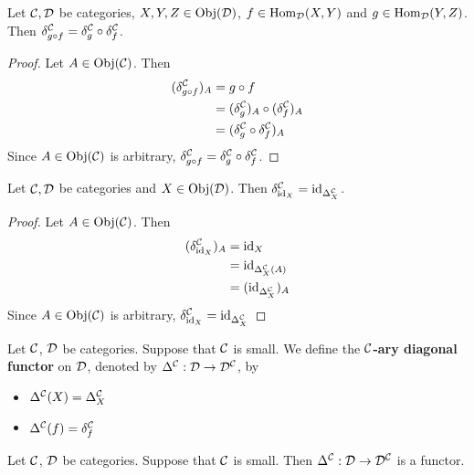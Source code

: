 \documentclass{book}
\begin{document}
	\begin{ex} 
		Let $\mathcal{C}, \mathcal{D}$ be categories, $X, Y, Z \in \operatorname{Obj}(\mathcal{D})$, $f \in \operatorname{Hom}_{\mathcal{D}}(X,Y)$ and $g \in \operatorname{Hom}_{\mathcal{D}}(Y,Z)$. Then $\delta^{\mathcal{C}}_{g \circ f} = \delta^{\mathcal{C}}_g \circ \delta^{\mathcal{C}}_f$.
	\end{ex}

	\begin{proof}
		Let $A \in \operatorname{Obj}(\mathcal{C})$. Then 
		\begin{align*}
			(\delta^{\mathcal{C}}_{g \circ f})_A
			& = g \circ f \\
			& = (\delta^{\mathcal{C}}_g)_A \circ (\delta^{\mathcal{C}}_f)_A \\
			& = (\delta^{\mathcal{C}}_g \circ \delta^{\mathcal{C}}_f)_A
		\end{align*}
		Since $A \in \operatorname{Obj}(\mathcal{C})$ is arbitrary, $\delta^{\mathcal{C}}_{g \circ f} = \delta^{\mathcal{C}}_g \circ \delta^{\mathcal{C}}_f$.
	\end{proof}

	\begin{ex} 
		Let $\mathcal{C}, \mathcal{D}$ be categories and $X \in \operatorname{Obj}(\mathcal{D})$. Then $\delta^{\mathcal{C}}_{\operatorname{id}_X} = \operatorname{id}_{\Delta^{\mathcal{C}}_X}$.
	\end{ex}

	\begin{proof}
		Let $A \in \operatorname{Obj}(\mathcal{C})$. Then 
		\begin{align*}
			(\delta^{\mathcal{C}}_{\operatorname{id}_X})_A
			& = \operatorname{id}_X \\
			& = \operatorname{id}_{\Delta^{\mathcal{C}}_X(A)} \\
			& = (\operatorname{id}_{\Delta^{\mathcal{C}}_X})_A 
		\end{align*}
		Since $A \in \operatorname{Obj}(\mathcal{C})$ is arbitrary, $\delta^{\mathcal{C}}_{\operatorname{id}_X} = \operatorname{id}_{\Delta^{\mathcal{C}}_X}$
	\end{proof}

	\begin{defn} 
		Let $\mathcal{C}$, $\mathcal{D}$ be categories. Suppose that $\mathcal{C}$ is small. We define the \textbf{$\mathcal{C}$-ary diagonal functor} on $\mathcal{D}$, denoted by $\Delta^{\mathcal{C}}: \mathcal{D} \rightarrow \mathcal{D}^{\mathcal{C}}$, by
		\begin{itemize}
			\item $\Delta^{\mathcal{C}}(X) = \Delta^{\mathcal{C}}_X$
			\item $\Delta^{\mathcal{C}}(f) = \delta^{\mathcal{C}}_f$
		\end{itemize}
	\end{defn}

	\begin{ex} 
		Let $\mathcal{C}$, $\mathcal{D}$ be categories. Suppose that $\mathcal{C}$ is small. Then $\Delta^{\mathcal{C}}: \mathcal{D} \rightarrow \mathcal{D}^{\mathcal{C}}$ is a functor.
	\end{ex}
\end{document}

